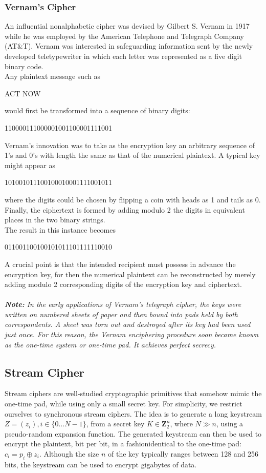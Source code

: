 \documentclass{article}
\begin{document}
\subsubsection{Vernam's Cipher}
An influential nonalphabetic cipher was devised by Gilbert S. Vernam in 1917 while he was employed by the American Telephone and Telegraph Company (AT\&T). Vernam was interested in safeguarding information sent by the newly developed teletypewriter in which each letter was represented as a five digit binary code.\\
Any plaintext message such as
\begin{center}
    ACT NOW
\end{center}
would first be transformed into a sequence of binary digits:
\begin{center}
    110000111000001001100001111001
\end{center}
Vernam's innovation was to take as the encryption key an arbitrary sequence of 1's and 0's with length the same as that of the numerical plaintext. A typical key might appear as
\begin{center}
    101001011100100010001111001011
\end{center}
where the digits could be chosen by flipping a coin with heads as 1 and tails as 0.\\
Finally, the ciphertext is formed by adding modulo 2 the digits in equivalent places in the two binary strings.\\ The result in this instance becomes
\begin{center}
    011001100100101011101111110010
\end{center}
A crucial point is that the intended recipient must possess in advance the encryption key, for then the numerical plaintext can be reconstructed by merely adding modulo 2 corresponding digits of the encryption key and ciphertext.\\ \\
{\it {\bf Note:} In the early applications of Vernam's telegraph cipher, the keys were written on numbered sheets of paper and then bound into pads held by both correspondents. A sheet was torn out and destroyed after its key had been used just once. For this reason, the Vernam enciphering procedure soon became known as the one-time system or one-time pad. It achieves perfect secrecy.}

\subsection{Stream Cipher}
Stream ciphers are well-studied cryptographic primitives that somehow mimic the one-time pad, while using only a small secret key. For simplicity, we restrict ourselves to synchronous stream ciphers. The idea is to generate
a long keystream $Z = (z_i), i \in \{0\dots N - 1\}$, from a secret key $K \in \mathbf{Z}^n_2$,
where $N \gg n$, using a pseudo-random expansion function. The generated keystream can then be used to encrypt the plaintext, bit per bit, in a fashionidentical to the one-time pad: $c_i = p_i \oplus z_i$. Although the size $n$ of the key
typically ranges between 128 and 256 bits, the keystream can be used to
encrypt gigabytes of data.
\end{document}

